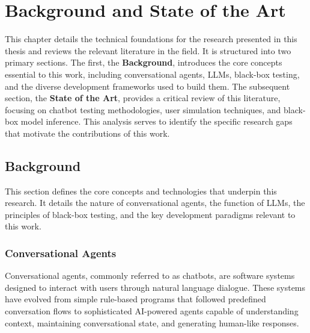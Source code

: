 
\chapter{Background and State of the Art}\label{chapter:state_of_the_art}

This chapter details the technical foundations
for the research presented in this thesis
and reviews the relevant literature in the field.
It is structured into two primary sections.
The first, the \textbf{Background},
introduces the core concepts essential to this work,
including conversational agents, \aclp{LLM}, black-box testing,
and the diverse development frameworks used to build them.
The subsequent section, the \textbf{State of the Art},
provides a critical review of this literature,
focusing on chatbot testing methodologies,
user simulation techniques, and black-box model inference.
This analysis serves to identify the specific research gaps
that motivate the contributions of this work.

\section{Background}\label{sec:background}

This section defines the core concepts and technologies that underpin this research.
It details the nature of conversational agents,
the function of \aclp{LLM}, the principles of black-box testing,
and the key development paradigms relevant to this work.

\subsection{Conversational Agents}

Conversational agents, commonly referred to as chatbots,
are software systems designed to interact with users through natural language dialogue.
These systems have evolved from simple rule-based programs that followed predefined conversation flows
to sophisticated AI-powered agents capable of understanding context, maintaining conversational state, and generating human-like responses.

